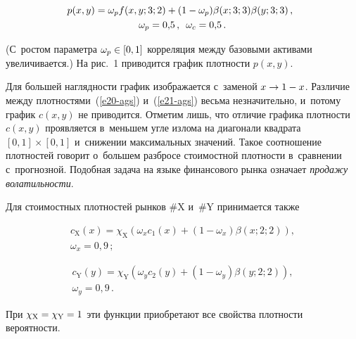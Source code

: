 \begin{multicols}{2}
  
     
  \vspace*{-3pt}
  
  \noindent
  \begin{multline}
  \!\!\!p(x,y)=\omega_p f(x,y;3;2)+(1-\omega_p)\beta(x;3;3)\beta(y;3;3)\,,\\
  \omega_p=0{,}5\,,\enskip \omega_c=0{,}5\,.
  \label{e21-ags}
  \end{multline}
  
  \vspace*{-2pt}
  
  \noindent
(С~ростом параметра $\omega_p\hm\in [0,1]$ корреляция между базовыми 
активами увеличивается.) На рис.~1 приводится график плотности $p(x, y)$. 


  
  Для большей наглядности график изображается с~заменой $x\hm\to 1\hm - x$. 
Различие между плотностями~(\ref{e20-ags}) и~(\ref{e21-ags}) весьма 
незначительно, и~потому график $c(x,y)$ не приводится. Отметим лишь, что 
отличие графика плотности $c(x,y)$ проявляется в~меньшем угле излома на 
диагонали квадрата $[0, 1]\times[0, 1]$ и~снижении максимальных значений. 
Такое соотношение плотностей говорит о~большем разбросе стоимостной 
плотности в~сравнении с~прогнозной. Подобная задача на языке финансового 
рынка означает \textit{продажу волатильности}. 
  
  Для стоимостных плотностей рынков \#X и~\#Y принимается также 
  
  \vspace*{-5pt}
  
\noindent
  \begin{multline}
  c_{\mathrm{X}}(x)=\chi_{\mathrm{X}} \left( \omega_x c_1(x)+(1-
\omega_x)\beta(x;2;2)\right),\\[-0.5pt]
  \omega_x=0{,}9\,;
  \label{e22-ags}
  \end{multline}
  
  \vspace*{-14pt}
  
  \noindent
  \begin{multline}
  c_{\mathrm{Y}}(y)=\chi_{\mathrm{Y}} \left( \omega_y c_2(y)+(1-
\omega_y)\beta(y;2;2)\right),\\[-0.5pt]
  \omega_y=0{,}9\,.
  \label{e23-ags}
  \end{multline}
  
  \vspace*{-4pt}
  
  \noindent
При $\chi_{\mathrm{X}}=\chi_{\mathrm{Y}}\hm=1$ эти функции приобретают 
все свойства плотности вероятности. 
  

\end{multicols}
